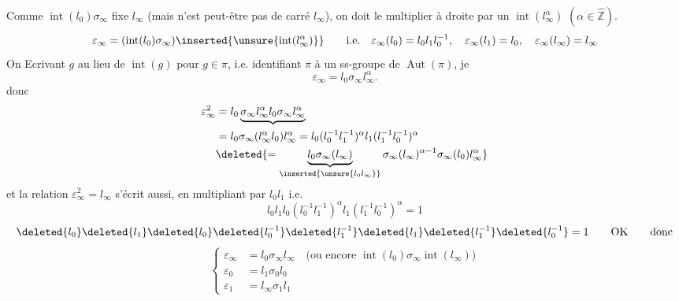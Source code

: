 Comme $\operatorname{int}(l_0)\sigma_\infty$ fixe $l_\infty$ (mais n'est peut-être pas de carré $l_\infty$), on doit le multiplier à droite par un $\operatorname{int}(l_\infty^\alpha)$ $(\alpha\in\widehat{\mathbb Z})$.
\deleted{\[
\varepsilon_\infty(l_\infty)=l_\infty,\qquad\varepsilon_\infty(l_0)=
\]}
\[
\varepsilon_\infty=(\operatorname{int}(l_0)\sigma_\infty)\inserted{\unsure{\operatorname{int}(l_\infty^\alpha)}}\qquad\text{i.e.}\quad
\varepsilon_\infty(l_0)=l_0l_1l_0^{-1},\quad\varepsilon_\infty(l_1)=l_0,\quad\varepsilon_\infty(l_\infty)=l_\infty
\]
On   Ecrivant $g$ au lieu de $\operatorname{int}(g)$ pour $g\in\pi$, i.e. identifiant $\pi$ à un ss-groupe de $\operatorname{Aut}(\pi)$, je  
\[
\varepsilon_\infty=l_0\sigma_\infty l_\infty^\alpha.
\]
\deleted{\[
\varepsilon_\infty^2=l_0\sigma_\infty l_0\sigma_\infty
=l_0\sigma_\infty l_0\sigma_\infty^{-1}=l_0\sigma_\infty(l_0)
\]}
donc
\[
\begin{aligned}
\varepsilon_\infty^2&=l_0\underbrace{\sigma_\infty l_\infty^\alpha l_0\sigma_\infty l_\infty^\alpha}\\
&=l_0\sigma_\infty(l_\infty^\alpha l_0)l_\infty^\alpha
=l_0(l_0^{-1}l_1^{-1})^\alpha l_1(l_1^{-1}l_0^{-1})^\alpha\\
&\deleted{=\underbrace{l_0\sigma_\infty(l_\infty)}_{\inserted{\unsure{l_0l_\infty}}}\sigma_\infty(l_\infty)^{\alpha-1}\sigma_\infty(l_0)l_\infty^\alpha}
\end{aligned}
\]
et la relation $\varepsilon_\infty^2=l_\infty$  s'écrit aussi, en multipliant par $l_0l_1$
\deleted{\[
l_0l_\infty\underbrace{\sigma_\infty(l_\infty)^{\alpha-1}}_{(l_0^{-1}l_1^{-1})^{\alpha-1}}\underbrace{\sigma_\infty(l_0)}_{l_1}l_\infty^{\alpha-1}=1
\]}
i.e.
\deleted{\[
\deleted{\unsure{l_\infty^{-1}l_\infty}}l_0^{1-\alpha}l_1^{2-\alpha}l_\infty^\alpha=1
\]}
\[
l_0l_1l_0(l_0^{-1}l_1^{-1})^\alpha l_1(l_1^{-1}l_0^{-1})^\alpha=1
\]
\deleted{\[
l_0l_1l_0l_0^{-1}l_1^{-1}l_0^{-1}l_1^{-1}l_1l_1l_0^{-1}l_1^{-1}l_0^{-1}=1?\qquad\text{Non !}
\]}
\[
\deleted{l_0}\deleted{l_1}\deleted{l_0}\deleted{l_0^{-1}}\deleted{l_1^{-1}}\deleted{l_1}\deleted{l_1^{-1}}\deleted{l_0^{-1}}=1
\qquad\text{OK}\qquad\text{donc}
\]
\[
\left\{\begin{aligned}
\varepsilon_\infty&=l_0\sigma_\infty l_\infty\quad\text{(ou encore }\operatorname{int}(l_0)\sigma_\infty\operatorname{int}(l_\infty)\text{)}\\
\varepsilon_0&=l_1\sigma_0l_0\\
\varepsilon_1&=l_\infty\sigma_1l_1
\end{aligned}\right.
\]
